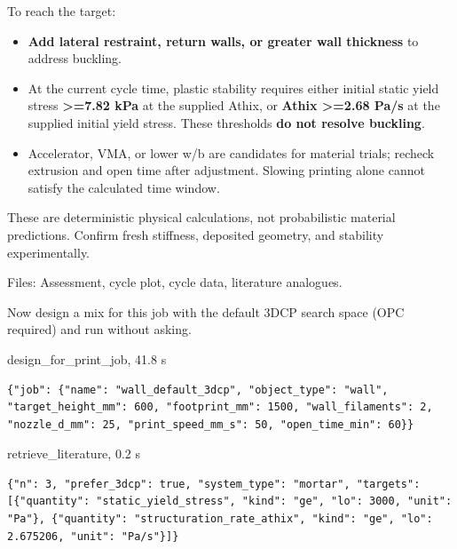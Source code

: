 \begin{agentbox}
\par
To reach the target:\par
\begin{itemize}[nosep,leftmargin=1.2em]
\item \textbf{Add lateral restraint, return walls, or greater wall thickness} to address buckling.
\item At the current cycle time, plastic stability requires either initial static yield stress \textbf{>=7.82 kPa} at the supplied Athix, or \textbf{Athix >=2.68 Pa/s} at the supplied initial yield stress. These thresholds \textbf{do not resolve buckling}.
\item Accelerator, VMA, or lower w/b are candidates for material trials; recheck extrusion and open time after adjustment. Slowing printing alone cannot satisfy the calculated time window.
\end{itemize}
These are deterministic physical calculations, not probabilistic material predictions. Confirm fresh stiffness, deposited geometry, and stability experimentally.\par
\par
Files: Assessment, cycle plot, cycle data, literature analogues.\par
\par
\end{agentbox}
\begin{userbox}
Now design a mix for this job with the default 3DCP search space (OPC required) and run without asking.
\end{userbox}
\begin{toolbox}{design\_for\_print\_job, 41.8 s}
\begin{lstlisting}[style=argstyle]
{"job": {"name": "wall_default_3dcp", "object_type": "wall", "target_height_mm": 600, "footprint_mm": 1500, "wall_filaments": 2, "nozzle_d_mm": 25, "print_speed_mm_s": 50, "open_time_min": 60}}
\end{lstlisting}
\end{toolbox}
\begin{toolbox}{retrieve\_literature, 0.2 s}
\begin{lstlisting}[style=argstyle]
{"n": 3, "prefer_3dcp": true, "system_type": "mortar", "targets": [{"quantity": "static_yield_stress", "kind": "ge", "lo": 3000, "unit": "Pa"}, {"quantity": "structuration_rate_athix", "kind": "ge", "lo": 2.675206, "unit": "Pa/s"}]}
\end{lstlisting}
\end{toolbox}
